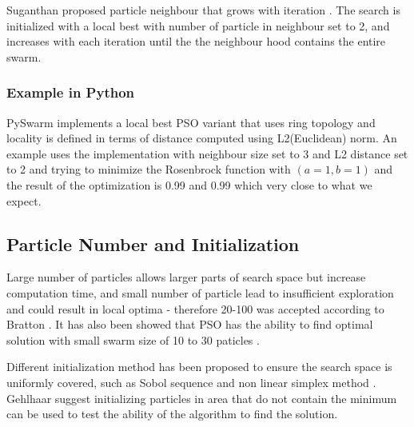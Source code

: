 \documentclass{article}
\begin{document}
Suganthan proposed particle neighbour that grows with iteration \cite{suganthan1999particle}. The search is initialized with a local best with number of particle in neighbour set to 2, and increases with each iteration until the the neighbour hood contains the entire swarm. 

\subsubsection{Example in Python}
PySwarm implements a local best PSO variant that uses ring topology and locality is defined in terms of distance computed using L2(Euclidean) norm. An example uses the implementation with neighbour size set to 3 and L2 distance set to 2 and trying to minimize the Rosenbrock function with $(a = 1, b = 1)$ and the result of the optimization is 0.99 and 0.99 which very close to what we expect. \cite{irfan_2021P}




\subsection{Particle Number and Initialization}
Large number of particles allows larger parts of search space but increase computation time, and small number of particle lead to insufficient exploration and could result in local optima - therefore 20-100 was accepted according to Bratton \cite{bratton2007defining}. It has also been showed that PSO has the ability to find optimal solution with small swarm size of 10 to 30 paticles \cite{bergh2001effects}. 

Different initialization method has been proposed to ensure the search space is uniformly covered, such as Sobol sequence \cite{parsopoulos2002particle} and non linear simplex method \cite{parsopoulos2002initializing}. Gehlhaar suggest initializing particles in area that do not contain the minimum can be used to test the ability of the algorithm to find the solution.
\end{document}

